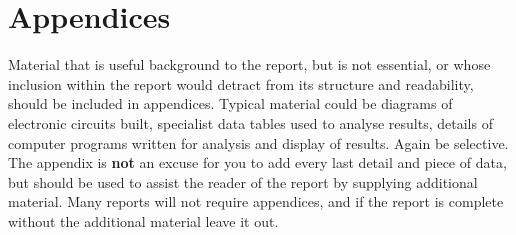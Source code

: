 \documentclass[a4paper,12pt]{article}
\begin{document}
\endgroup


\appendix
\section{Appendices}

Material that is useful background to the report, but is not essential,
or whose inclusion within the report  would detract from its
structure and readability, should be included in appendices. Typical
material could be diagrams of electronic circuits built, specialist
data tables used to analyse results, details of computer programs
written for analysis and display of results. Again be selective. The appendix is {\bf not} an excuse for you to add every
last detail and piece of data, but should be used to assist the reader
of the report by supplying additional material. Many reports will not require
appendices, and if the report is complete without the additional
material leave it out.
\end{document}
